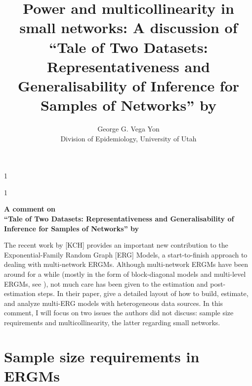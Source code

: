 \documentclass[12pt]{article}
\newcommand{\blind}{0}
\begin{document}
%

\def\spacingset#1{\renewcommand{\baselinestretch}%
{#1}\small\normalsize} \spacingset{1}



\def\blind{1}

\blind
{
  \title{\bf Power and multicollinearity in small networks: A discussion of\\``Tale of Two Datasets: Representativeness
  and Generalisability of Inference for Samples of Networks'' by \citeauthor*{krivitskyTaleTwoDatasets2022}}
  \author{George G. Vega Yon\hspace{.2cm}\\%
    Division of Epidemiology, University of Utah
    }
  \maketitle
} \fi

\blind
{
  \bigskip
  \bigskip
  \bigskip
  \begin{center}
    {\LARGE\bf A comment on\\``Tale of Two Datasets: Representativeness
    and Generalisability of Inference for Samples of Networks'' by \citeauthor*{krivitskyTaleTwoDatasets2022}}
\end{center}
  \medskip
} \fi

\spacingset{1.9} %

The recent work by \citeauthor*{krivitskyTaleTwoDatasets2022} [KCH] provides an important new contribution to the Exponential-Family Random Graph [ERG] Models, a start-to-finish approach to dealing with multi-network ERGMs. Although multi-network ERGMs have been around for a while (mostly in the form of block-diagonal models and multi-level ERGMs, see \cite{duxburyScalingBiasPooled2023,wangExponentialRandomGraph2013, slaughterMultilevelModelsSocial2016}), not much care has been given to the estimation and post-estimation steps. In their paper, \citeauthor*{krivitskyTaleTwoDatasets2022} give a detailed layout of how to build, estimate, and analyze multi-ERG models with heterogeneous data sources. In this comment, I will focus on two issues the authors did not discuss: sample size requirements and multicollinearity, the latter regarding small networks. 


\section{Sample size requirements in ERGMs}
\end{document}
